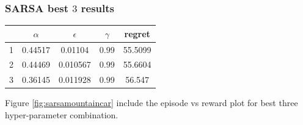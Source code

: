 \documentclass[11pt, a4]{article}
\begin{document}
			\subsubsection{SARSA best $3$ results}
				\begin{center}
					\begin{tabular}{|c|c|c|c|c|}
						\hline
						 & $\alpha$ & $\epsilon$ & $\gamma$ & regret\\
						\hline
						1 & 0.44517 & 0.01104 & 0.99 & 55.5099\\
						\hline
						2 & 0.44469 & 0.010567 & 0.99 & 55.6604 \\
						\hline
						3 & 0.36145 & 0.011928 & 0.99 & 56.547\\
						\hline
					\end{tabular}
				\end{center}
				Figure \ref{fig:sarsamountaincar} include the episode vs reward plot for best three hyper-parameter combination.
\end{document}
